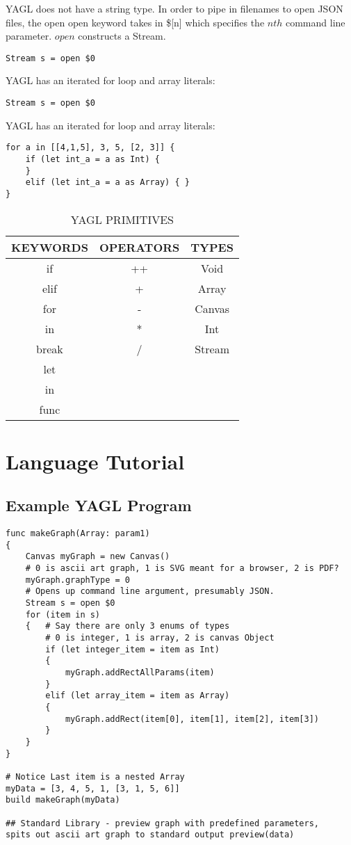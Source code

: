 \documentclass[12pt]{article}
\begin{document}
YAGL does not have a string type. In order to pipe in filenames to open JSON files, the open open keyword takes in \$[n] which specifies the $n{th}$ command line parameter. $open$ constructs a Stream.
\begin{lstlisting}
Stream s = open $0
\end{lstlisting}

YAGL has an iterated for loop and array literals:
\begin{lstlisting}
Stream s = open $0
\end{lstlisting}
YAGL has an iterated for loop and array literals:
\begin{lstlisting}
for a in [[4,1,5], 3, 5, [2, 3]] {
	if (let int_a = a as Int) {
	}
	elif (let int_a = a as Array) { }
}
\end{lstlisting}
\begin{table}[H]
\caption{YAGL PRIMITIVES}
\centering
\begin{tabular}{c c c }
\hline\hline
KEYWORDS & OPERATORS & TYPES \\ [0.5ex] %
\hline
if&++&Void \\
elif&+&Array \\
for&-&Canvas \\
in&*&Int \\
break&/&Stream \\
let\\
in\\
func \\

\hline
\end{tabular}
\end{table}



\section{Language Tutorial}
\subsection{Example YAGL Program}
\begin{lstlisting}
func makeGraph(Array: param1)
{
	Canvas myGraph = new Canvas()
	# 0 is ascii art graph, 1 is SVG meant for a browser, 2 is PDF?
	myGraph.graphType = 0
	# Opens up command line argument, presumably JSON.
	Stream s = open $0
	for (item in s)
	{	# Say there are only 3 enums of types
		# 0 is integer, 1 is array, 2 is canvas Object
		if (let integer_item = item as Int)
		{
			myGraph.addRectAllParams(item)
		}
		elif (let array_item = item as Array)
		{
			myGraph.addRect(item[0], item[1], item[2], item[3])
		}
	}
}

# Notice Last item is a nested Array 
myData = [3, 4, 5, 1, [3, 1, 5, 6]]
build makeGraph(myData)

## Standard Library - preview graph with predefined parameters, 
spits out ascii art graph to standard output preview(data)
\end{lstlisting}
\end{document}
